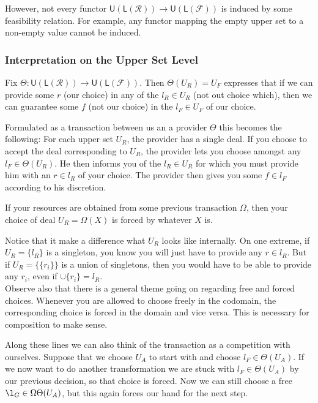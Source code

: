 \documentclass[12pt]{article}
\theoremstyle{definition}
\theoremstyle{plain}
\theoremstyle{plain}
\theoremstyle{plain}
\theoremstyle{plain}
\theoremstyle{remark}
\theoremstyle{remark}
\newcommand{\mc}[1]{\mathcal{#1}}
\newcommand{\low}{\mathsf{L}}
\newcommand{\upper}{\mathsf{U}}
\begin{document}
However, not every functor $\upper(\low(\mc{R})) \rightarrow \upper(\low(\mc{F}))$ is induced by some feasibility relation. For example, any functor mapping the empty upper set to a non-empty value cannot be induced.  

\subsubsection{Interpretation on the Upper Set Level}
Fix $\Theta: \upper(\low(\mc{R})) \rightarrow \upper(\low(\mc{F}))$. Then $\Theta(U_R) = U_F$ expresses that if we can provide some $r$ (our choice) in any of the $l_R \in U_R$ (not out choice which), then we can guarantee some $f$ (not our choice) in the $l_F \in U_F$ of our choice. 

Formulated as a transaction between us an a provider $\Theta$ this becomes the following: For each upper set $U_R$, the provider has a single deal. If you choose to accept the deal corresponding to $U_R$, the provider lets you choose amongst any $l_F \in \Theta(U_R)$. He then informs you of the $l_R \in U_R$ for which you must provide him with an $r \in l_R$ of your choice. The provider then gives you some $f \in l_F$ according to his discretion. 

If your resources are obtained from some previous transaction $\Omega$, then your choice of deal $U_R=\Omega(X)$ is forced by whatever $X$ is.

Notice that it make a difference what $U_R$ looks like internally. On one extreme, if $U_R=\{l_R\}$ is a singleton, you know you will just have to provide any $r \in l_R$. But if $U_R = \{\{r_i\}\}$ is a union of singletons, then you would have to be able to provide any $r_i$, even if $\cup\{r_i\}=l_R$. \\

Observe also that there is a general theme going on regarding free and forced choices. Whenever you are allowed to choose freely in the codomain, the corresponding choice is forced in the domain and vice versa. This is necessary for composition to make sense.  

Along these lines we can also think of the transaction as a competition with ourselves. Suppose that we choose $U_A$ to start with and choose $l_F \in \Theta(U_A)$. If we now want to do another transformation we are stuck with $l_F \in \Theta(U_A)$ by our previous decision, so that choice is forced. Now we can still choose a free $\l_G \in \Omega\Theta(U_A)$, but this again forces our hand for the next step.
\end{document}

